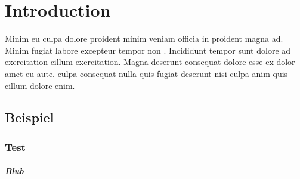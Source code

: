 
\chapter{Introduction} \label{ch:introduction}

Minim eu culpa dolore proident minim veniam officia in proident magna ad. Minim fugiat labore excepteur tempor non \cite{test.2022}. Incididunt tempor sunt dolore ad exercitation cillum exercitation. Magna deserunt consequat dolore esse ex dolor amet eu aute. \textcite{test.2022} culpa consequat nulla quis fugiat deserunt nisi culpa anim quis cillum dolore enim.

\section{Beispiel} \label{sec:beispiel}

\subsection{Test} \label{subsec:test}

\paragraph{Blub} \label{par:blub}
